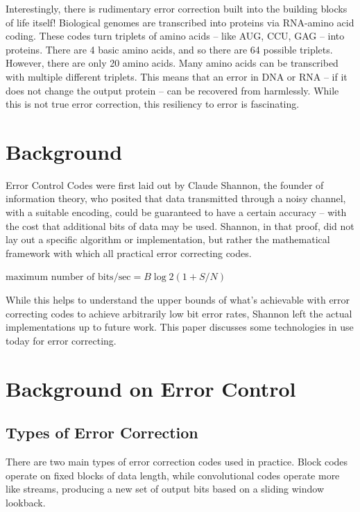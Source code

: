 \documentclass[12pt]{article}
\begin{document}
Interestingly, there is rudimentary error correction built into the building blocks of life itself! Biological genomes are transcribed into proteins via RNA-amino acid coding. These codes turn triplets of amino acids -- like AUG, CCU, GAG -- into proteins. There are 4 basic amino acids, and so there are 64 possible triplets. However, there are only 20 amino acids. Many amino acids can be transcribed with multiple different triplets. This means that an error in DNA or RNA -- if it does not change the output protein -- can be recovered from harmlessly. While this is not true error correction, this resiliency to error is fascinating. \cite{wolf}

\section{Background}

Error Control Codes were first laid out by Claude Shannon, the founder of information theory, who posited that data transmitted through a noisy channel, with a suitable encoding, could be guaranteed to have a certain accuracy -- with the cost that additional bits of data may be used. Shannon, in that proof, did not lay out a specific algorithm or implementation, but rather the mathematical framework with which all practical error correcting codes. \cite{pless}

$\text{maximum number of bits/sec} = B\log 2 (1 + S/N)$ \cite{tanenbaum}

While this helps to understand the upper bounds of what's achievable with error correcting codes to achieve arbitrarily low bit error rates, Shannon left the actual implementations up to future work. This paper discusses some technologies in use today for error correcting.

\section{Background on Error Control}

\subsection{Types of Error Correction}

There are two main types of error correction codes used in practice. Block codes operate on fixed blocks of data length, while convolutional codes operate more like streams, producing a new set of output bits based on a sliding window lookback. 
\end{document}
